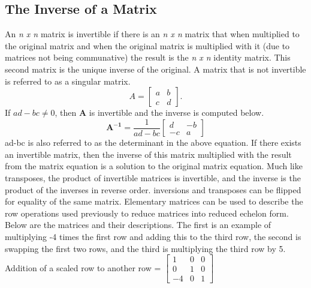 \documentclass[12pt]{article}
\begin{document}
\subsection{The Inverse of a Matrix}
An \textit{n x n} matrix is invertible if there is an \textit{n x n} matrix that when multiplied to the original matrix and when the original matrix is multiplied with it %
(due to matrices not being communative) the result is the \textit{n x n} identity matrix. This second matrix is the unique inverse of the original. A matrix that is %
not invertible is referred to as a singular matrix. 
\newline
$$
A=\begin{bmatrix}
    a & b \\
    c & d
\end{bmatrix}. 
$$
\newline
\newline
If $ad-bc\neq0$, then \textbf{A} is invertible and the inverse is computed below. 
\newline
\newline
$$
\mathbf{A^{-1}}=\dfrac{1}{ad-bc}\begin{bmatrix}
    d & -b \\
    -c & a
\end{bmatrix}
$$
\newline
\newline
ad-bc is also referred to as the determinant in the above equation. If there exists an invertible matrix, then the inverse of this matrix multiplied with the result from %
the matrix equation is a solution to the original matrix equation. Much like transposes, the product of invertible matrices is invertible, and the inverse is the product %
of the inverses in reverse order. inversions and transposes can be flipped for equality of the same matrix. 
\newline
\newline
Elementary matrices can be used to describe the row operations used previously to reduce matrices into reduced echelon form. Below are the matrices and their descriptions. %
The first is an example of multiplying -4 times the first row and adding this to the third row, the second is swapping the first two rows, and the third is multiplying the %
third row by 5.
\newline
\newline
\newline
Addition of a scaled row to another row = $\begin{bmatrix}
    1 & 0 & 0 \\
    0 & 1 & 0 \\
    -4 & 0 & 1
\end{bmatrix}$ 
\end{document}
